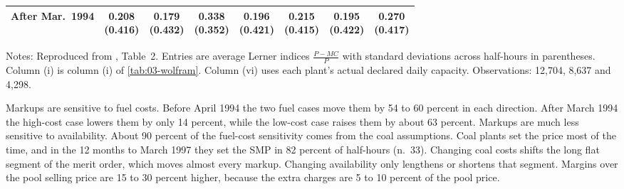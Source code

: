 \begin{table}[htbp]
\begin{threeparttable}
\begin{tabular}{@{}lccccccc@{}}
\addlinespace
After Mar.\ 1994 & \makecell{0.208\\(0.416)} & \makecell{0.179\\(0.432)} & \makecell{0.338\\(0.352)} &
  \makecell{0.196\\(0.421)} & \makecell{0.215\\(0.415)} & \makecell{0.195\\(0.422)} & \makecell{0.270\\(0.417)} \\
\bottomrule
\end{tabular}
\begin{tablenotes}\footnotesize
\item Notes: Reproduced from \citet{Wolfram1999}, Table~2. Entries are average Lerner indices $\frac{P - MC}{P}$ with
standard deviations across half-hours in parentheses. Column (i) is column (i) of \cref{tab:03-wolfram}. Column (vi)
uses each plant's actual declared daily capacity. Observations: 12,704, 8,637 and 4,298.
\end{tablenotes}
\end{threeparttable}
\end{table}

Markups are sensitive to fuel costs. Before April 1994 the two fuel cases move them by 54 to 60 percent in each
direction. After March 1994 the high-cost case lowers them by only 14 percent, while the low-cost case raises them by
about 63 percent. Markups are much less sensitive to availability. About 90 percent of the fuel-cost sensitivity comes from the coal assumptions. Coal plants set
the price most of the time, and in the 12 months to March 1997 they set the SMP in 82 percent of half-hours
(n.~33). Changing coal costs shifts the long flat segment of the merit order, which moves almost every markup.
Changing availability only lengthens or shortens that segment. Margins over the pool selling price are 15 to 30 percent
higher, because the extra charges are 5 to 10 percent of the pool price.


